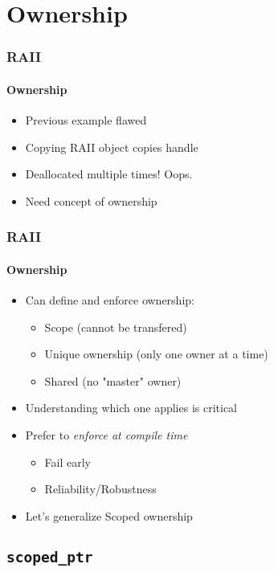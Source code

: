 \section{Ownership}
\frame{\sectionpage}

\begin{frame}
    \frametitle{RAII}
    \framesubtitle{Ownership}
    \begin{itemize}
        \item Previous example flawed
        \item Copying RAII object copies handle
        \item Deallocated multiple times! Oops.
        \item Need concept of ownership
    \end{itemize}
\end{frame}

\begin{frame}
    \frametitle{RAII}
    \framesubtitle{Ownership}
    \begin{itemize}
        \item Can define and enforce ownership:
            \begin{itemize}
                \item Scope (cannot be transfered)
                \item Unique ownership (only one owner at a time)
                \item Shared (no "master" owner)
            \end{itemize}
        \item Understanding which one applies is critical
        \item Prefer to \emph{enforce at compile time}
            \begin{itemize}
                \item Fail early
                \item Reliability/Robustness
            \end{itemize}
        \item Let's generalize Scoped ownership
    \end{itemize}
\end{frame}

\subsection{\texttt{scoped\_ptr}}
\frame{\subsectionpage}

